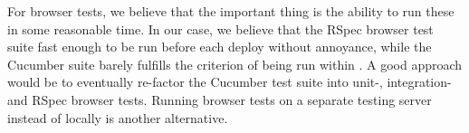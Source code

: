 For browser tests, we believe that the important thing is the ability to
run these in some reasonable time. In our case, we believe that the
RSpec browser test suite fast enough to be run before each deploy
without annoyance, while the Cucumber suite barely fulfills the
criterion of being run within . A good approach
would be to eventually re-factor the Cucumber test suite into unit-,
integration- and RSpec browser tests. Running browser tests on a
separate testing server instead of locally is another alternative.\\

